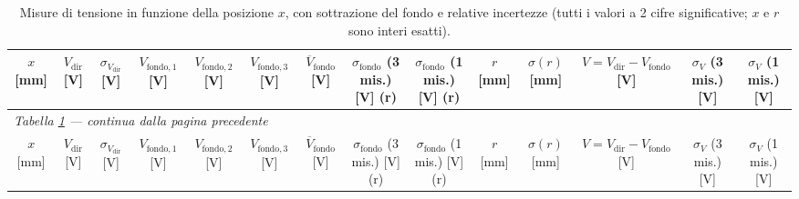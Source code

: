 \documentclass[a4paper,10pt]{article}
\begin{document}
\scriptsize

\begin{longtable}{*{14}{c}}
\caption{Misure di tensione in funzione della posizione $x$, con sottrazione del fondo e relative incertezze (tutti i valori a 2 cifre significative; $x$ e $r$ sono interi esatti).}\label{tab:dati}\\
\toprule
\makecell{$x$\\{[mm]}} & \makecell{$V_\mathrm{dir}$\\{[V]}} & \makecell{$\sigma_{V_\mathrm{dir}}$\\{[V]}} & \makecell{$V_\mathrm{fondo,1}$\\{[V]}} & \makecell{$V_\mathrm{fondo,2}$\\{[V]}} & \makecell{$V_\mathrm{fondo,3}$\\{[V]}} & \makecell{$\overline{V}_\mathrm{fondo}$\\{[V]}} & \makecell{$\sigma_\mathrm{fondo}$ (3 mis.)\\{[V]} (r)} & \makecell{$\sigma_\mathrm{fondo}$ (1 mis.)\\{[V]} (r)} & \makecell{$r$\\{[mm]}} & \makecell{$\sigma(r)$\\{[mm]}} & \makecell{$V=V_\mathrm{dir}-V_\mathrm{fondo}$\\{[V]}} & \makecell{$\sigma_V$ (3 mis.)\\{[V]}} & \makecell{$\sigma_V$ (1 mis.)\\{[V]}} \\
\midrule
\endfirsthead
\multicolumn{14}{l}{\scriptsize\textit{Tabella \ref{tab:dati} --- continua dalla pagina precedente}}\\
\toprule
\makecell{$x$\\{[mm]}} & \makecell{$V_\mathrm{dir}$\\{[V]}} & \makecell{$\sigma_{V_\mathrm{dir}}$\\{[V]}} & \makecell{$V_\mathrm{fondo,1}$\\{[V]}} & \makecell{$V_\mathrm{fondo,2}$\\{[V]}} & \makecell{$V_\mathrm{fondo,3}$\\{[V]}} & \makecell{$\overline{V}_\mathrm{fondo}$\\{[V]}} & \makecell{$\sigma_\mathrm{fondo}$ (3 mis.)\\{[V]} (r)} & \makecell{$\sigma_\mathrm{fondo}$ (1 mis.)\\{[V]} (r)} & \makecell{$r$\\{[mm]}} & \makecell{$\sigma(r)$\\{[mm]}} & \makecell{$V=V_\mathrm{dir}-V_\mathrm{fondo}$\\{[V]}} & \makecell{$\sigma_V$ (3 mis.)\\{[V]}} & \makecell{$\sigma_V$ (1 mis.)\\{[V]}} \\

\end{longtable}
\end{document}
